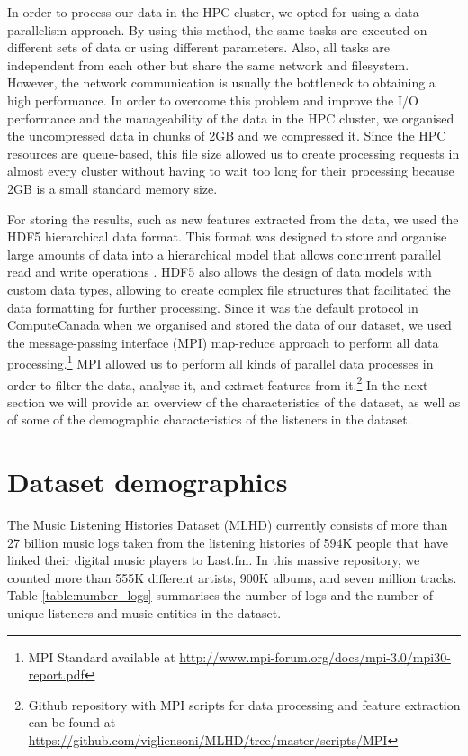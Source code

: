 In order to process our data in the HPC cluster, we opted for using a data parallelism approach. By using this method, the same tasks are executed on different sets of data or using different parameters. Also, all tasks are independent from each other but share the same network and filesystem. However, the network communication is usually the bottleneck to obtaining a high performance. 
In order to overcome this problem and improve the I/O performance and the manageability of the data in the HPC cluster, we organised the uncompressed data in chunks of 2GB and we compressed it. Since the HPC resources are queue-based, this file size allowed us to create processing requests in almost every cluster without having to wait too long for their processing because 2GB is a small standard memory size. 

For storing the results, such as new features extracted from the data, we used the HDF5 hierarchical data format. This format was designed to store and organise large amounts of data into a hierarchical model that allows concurrent parallel read and write operations \autocite{folk99hdf5}. HDF5 also allows the design of data models with custom data types, allowing to create complex file structures that facilitated the data formatting for further processing.
Since it was the default protocol in ComputeCanada when we organised and stored the data of our dataset, we used the message-passing interface (MPI) map-reduce approach to perform all data processing.\footnote{MPI Standard available at \url{http://www.mpi-forum.org/docs/mpi-3.0/mpi30-report.pdf}} 
MPI allowed us to perform all kinds of parallel data processes in order to filter the data, analyse it, and extract features from it.\footnote{Github repository with MPI scripts for data processing and feature extraction can be found at \url{https://github.com/vigliensoni/MLHD/tree/master/scripts/MPI}}
In the next section we will provide an overview of the characteristics of the dataset, as well as of some of the demographic characteristics of the listeners in the dataset.












\section{Dataset demographics}\label{sec:5-dataset-demographics}
The Music Listening Histories Dataset (MLHD) currently consists of more than 27 billion music logs taken from the listening histories of 594K people that have linked their digital music players to Last.fm. 
In this massive repository, we counted more than 555K different artists, 900K albums, and seven million tracks. 
Table \ref{table:number_logs} summarises the number of logs and the number of unique listeners and music entities in the dataset. 




